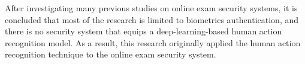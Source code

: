 After investigating many previous studies on online exam security systems, it is concluded that most of the research is limited to biometrics authentication, and there is no security system that equips a deep-learning-based human action recognition model.
As a result, this research originally applied the human action recognition technique to the online exam security system.